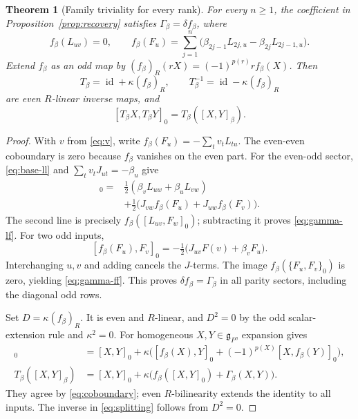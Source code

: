 \documentclass[11pt]{article}
\numberwithin{equation}{section}
\newtheorem{theorem}{Theorem}[section]
\theoremstyle{remark}
\begin{document}
\begin{theorem}[Family triviality for every rank]\label{thm:main}
For every $n\geq1$, the coefficient in Proposition~\ref{prop:recovery} satisfies
$\Gamma_\beta=\delta f_\beta$, where
\begin{equation}\label{eq:primitive}
 f_\beta(L_{uv})=0,\qquad
 f_\beta(F_u)=\sum_{j=1}^n
 \bigl(\beta_{2j-1}L_{2j,u}-\beta_{2j}L_{2j-1,u}\bigr).
\end{equation}
Extend $f_\beta$ as an odd map by
$(f_\beta)_R(rX)=(-1)^{p(r)}r f_\beta(X)$. Then
\begin{equation}\label{eq:splitting}
 T_\beta=\operatorname{id}+\kappa(f_\beta)_R,
 \qquad T_\beta^{-1}=\operatorname{id}-\kappa(f_\beta)_R
\end{equation}
are even $R$-linear inverse maps, and
\begin{equation}\label{eq:intertwining}
 [T_\beta X,T_\beta Y]_0=T_\beta([X,Y]_\beta).
\end{equation}
\end{theorem}
\begin{proof}
With $v$ from \eqref{eq:v}, write
$f_\beta(F_u)=-\sum_t v_tL_{tu}$.
The even-even coboundary is zero because $f_\beta$ vanishes on the even part.
For the even-odd sector, \eqref{eq:base-ll} and
$\sum_t v_tJ_{ut}=-\beta_u$ give
\begin{align*}
 [L_{uv},f_\beta(F_w)]_0
 ={}&\tfrac{1}{2}(\beta_vL_{uw}+\beta_uL_{vw})\\
 &+\tfrac{1}{2}\bigl(J_{vw}f_\beta(F_u)+J_{uw}f_\beta(F_v)\bigr).
\end{align*}
The second line is precisely $f_\beta([L_{uv},F_w]_0)$; subtracting it
proves \eqref{eq:gamma-lf}. For two odd inputs,
\[
 [f_\beta(F_u),F_v]_0
 =-\tfrac{1}{2}\bigl(J_{uv}F(v)+\beta_vF_u\bigr).
\]
Interchanging $u,v$ and adding cancels the $J$-terms.
The image $f_\beta(\{F_u,F_v\}_0)$ is zero, yielding
\eqref{eq:gamma-ff}. This proves $\delta f_\beta=\Gamma_\beta$ in all
parity sectors, including the diagonal odd rows.

Set $D=\kappa(f_\beta)_R$. It is even and $R$-linear, and
$D^2=0$ by the odd scalar-extension rule and $\kappa^2=0$.
For homogeneous $X,Y\in\mathfrak g_P$, expansion gives
\begin{align*}
 [T_\beta X,T_\beta Y]_0
 &= [X,Y]_0+\kappa\bigl([f_\beta(X),Y]_0
                   +(-1)^{p(X)}[X,f_\beta(Y)]_0\bigr),\\
 T_\beta([X,Y]_\beta)
 &= [X,Y]_0+\kappa\bigl(f_\beta([X,Y]_0)+\Gamma_\beta(X,Y)\bigr).
\end{align*}
They agree by \eqref{eq:coboundary}; even $R$-bilinearity extends the identity
to all inputs. The inverse in \eqref{eq:splitting} follows from $D^2=0$.
\end{proof}
\end{document}
